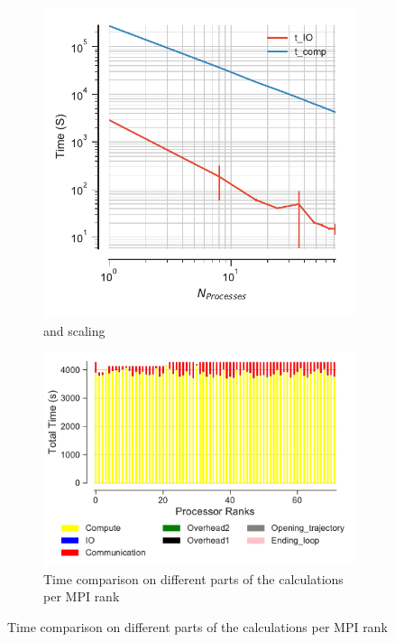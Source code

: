 \begin{figure}[ht!]
\begin{subfigure} {0.4\textwidth}
  \includegraphics[width=\linewidth]{figures/main-dihed-time_comp_IO_comparison.pdf}
\caption{\tcomp and \tIO scaling}
\label{fig:ScalingComputeIO-dihed}
\end{subfigure}
\hfill
\begin{subfigure} {.5\textwidth}
  \includegraphics[width=\linewidth]{figures/main-dihedral-BarPlot-rank-comparison_72_5.pdf}
  \caption{Time comparison on different parts of the calculations per MPI rank}
  \label{fig:MPIranks-dihed}
\end{subfigure}


\end{figure}
